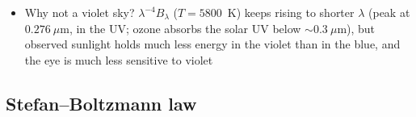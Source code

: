 \documentclass[11pt, oneside]{article}
\begin{document}
\begin{itemize}
\begin{itemize}
\begin{itemize}
			\item[$\hookrightarrow$] Why not a violet sky? $\lambda^{-4}B_\lambda$ ($T = 5800$~K) keeps rising to shorter $\lambda$ (peak at $0.276~\mu$m, in the UV; ozone absorbs the solar UV below ${\sim}0.3~\mu$m), but observed sunlight holds much less energy in the violet than in the blue, and the eye is much less sensitive to violet
		\end{itemize}
	\end{itemize}
\end{itemize}

\subsection{Stefan--Boltzmann law}
\label{s:sb}
\end{document}
